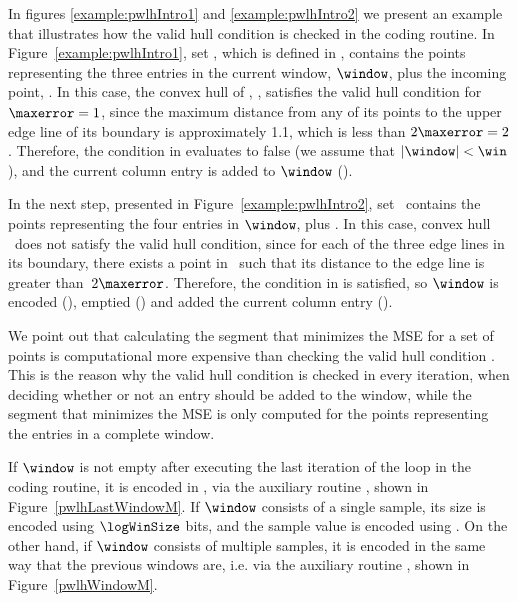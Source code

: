In figures \ref{example:pwlhIntro1} and \ref{example:pwlhIntro2} we present an example that illustrates how the valid hull condition is checked in the coding routine. In Figure~\ref{example:pwlhIntro1}, set \PWLHSet, which is defined in , contains the points representing the three entries in the current window, $\window$, plus the incoming point, . In this case, the convex hull of \PWLHSet, \hull, satisfies the valid hull condition for $\maxerror = 1$, since the maximum distance from any of its points to the upper edge line of its boundary is approximately 1.1, which is less than $2\maxerror = 2$. Therefore, the condition in  evaluates to false (we assume that $|\window|<\win$), and the current column entry is added to $\window$ ().


In the next step, presented in Figure~\ref{example:pwlhIntro2}, set \PWLHSet\ contains the points representing the four entries in $\window$, plus . In this case, convex hull \hull\ does not satisfy the valid hull condition, since for each of the three edge lines in its boundary, there exists a point in \hull\ such that its distance to the edge line is greater than~$2\maxerror$. Therefore, the condition in  is satisfied, so $\window$ is encoded (), emptied () and added the current column entry ().


\vspace{+5pt}
\examplePWLH


We point out that calculating the segment that minimizes the MSE for a set of points is computational more expensive than checking the valid hull condition \cite{AnEva2013}. This is the reason why the valid hull condition is checked in every iteration, when deciding whether or not an entry should be added to the window, while the segment that minimizes the MSE is only computed for the points representing the entries in a complete window.


If $\window$ is not empty after executing the last iteration of the loop in the coding routine, it is encoded in , via the auxiliary routine \EncodeLastWindowPWLH, shown in Figure~\ref{pwlhLastWindowM}. If $\window$ consists of a single sample, its size is encoded using $\logWinSize$ bits, and the sample value is encoded using \tobitexp. On the other hand, if $\window$ consists of multiple samples, it is encoded in the same way that the previous windows are, i.e. via the auxiliary routine \EncodeWindow, shown in Figure~\ref{pwlhWindowM}.






